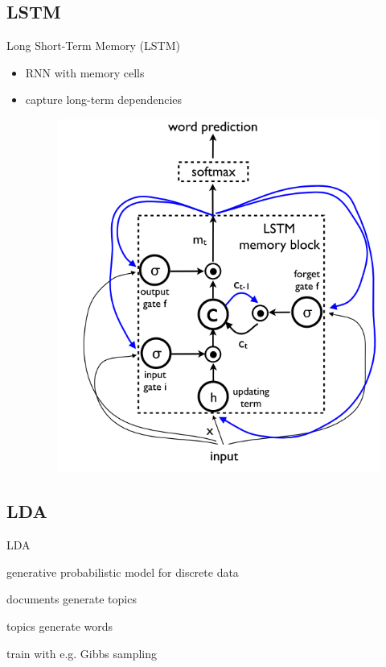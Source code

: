 \documentclass[16pt]{beamer}
\newenvironment{wideitemize}{\itemize\addtolength{\itemsep}{10pt}}{\enditemize}
\begin{document}
\subsection{LSTM}%
\begin{frame}{Long Short-Term Memory (LSTM)}{\cite{SeppHochreiter1997}}
\begin{itemize}
\item RNN with memory cells
\item capture long-term dependencies
\begin{figure}[tb]
           \centering
           \includegraphics[scale=0.4]{lstm.PNG}
           \\\cite{Google}
\end{figure}

\end{itemize}
\end{frame}



\subsection{LDA}%
\begin{frame}{LDA \cite{Blei2012}}
\begin{wideitemize}
\item generative probabilistic model for discrete data
\item documents generate topics
\item topics generate words
\item train with e.g. Gibbs sampling

\end{wideitemize}
\end{frame}
\end{document}

